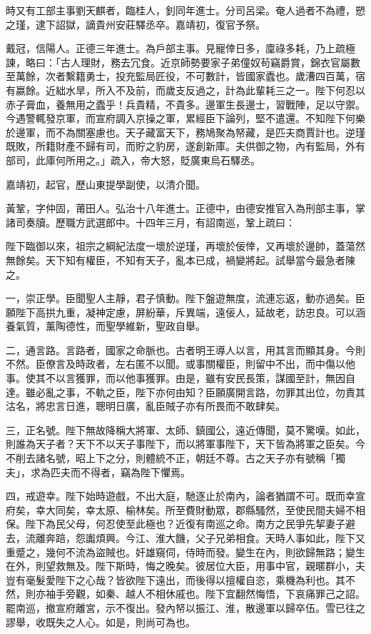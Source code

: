 \begin{pinyinscope}
時又有工部主事劉天麒者，臨桂人，釗同年進士。分司呂梁。奄人過者不為禮，愬之瑾，逮下詔獄，謫貴州安莊驛丞卒。嘉靖初，復官予祭。

戴冠，信陽人。正德三年進士。為戶部主事。見寵倖日多，廩祿多耗，乃上疏極諫，略曰：「古人理財，務去冗食。近京師勢要家子弟僮奴茍竊爵賞，錦衣官屬數至萬餘，次者繫籍勇士，投充監局匠役，不可數計，皆國家蠹也。歲漕四百萬，宿有嬴餘。近絀水旱，所入不及前，而歲支反過之，計為此輩耗三之一。陛下何忍以赤子膏血，養無用之蠹乎！兵貴精，不貴多。邊軍生長邊士，習戰陣，足以守禦。今遇警輒發京軍，而宣府調入京操之軍，累經臣下論列，堅不遣還。不知陛下何樂於邊軍，而不為關塞慮也。天子藏富天下，務鳩聚為帑藏，是匹夫商賈計也。逆瑾既敗，所籍財產不歸有司，而貯之豹房，遂創新庫。夫供御之物，內有監局，外有部司，此庫何所用之。」疏入，帝大怒，貶廣東烏石驛丞。

嘉靖初，起官，歷山東提學副使，以清介聞。

黃鞏，字仲固，莆田人。弘治十八年進士。正德中，由德安推官入為刑部主事，掌諸司奏牘。歷職方武選郎中。十四年三月，有詔南巡，鞏上疏曰：

陛下臨御以來，祖宗之綱紀法度一壞於逆瑾，再壞於佞倖，又再壞於邊帥，蓋蕩然無餘矣。天下知有權臣，不知有天子，亂本已成，禍變將起。試舉當今最急者陳之。

一，崇正學。臣聞聖人主靜，君子慎動。陛下盤遊無度，流連忘返，動亦過矣。臣願陛下高拱九重，凝神定慮，屏紛華，斥異端，遠佞人，延故老，訪忠良。可以涵養氣質，薰陶德性，而聖學維新，聖政自舉。

二，通言路。言路者，國家之命脈也。古者明王導人以言，用其言而顯其身。今則不然。臣僚言及時政者，左右匿不以聞。或事關權臣，則留中不出，而中傷以他事。使其不以言獲罪，而以他事獲罪。由是，雖有安民長策，謀國至計，無因自達。雖必亂之事，不軌之臣，陛下亦何由知？臣願廣開言路，勿罪其出位，勿責其沽名，將忠言日進，聰明日廣，亂臣賊子亦有所畏而不敢肆矣。

三，正名號。陛下無故降稱大將軍、太師、鎮國公，遠近傳聞，莫不驚嘆。如此，則誰為天子者？天下不以天子事陛下，而以將軍事陛下，天下皆為將軍之臣矣。今不削去諸名號，昭上下之分，則體統不正，朝廷不尊。古之天子亦有號稱「獨夫」，求為匹夫而不得者，竊為陛下懼焉。

四，戒遊幸。陛下始時遊戲，不出大庭，馳逐止於南內，論者猶謂不可。既而幸宣府矣，幸大同矣，幸太原、榆林矣。所至費財動眾，郡縣騷然，至使民間夫婦不相保。陛下為民父母，何忍使至此極也？近復有南巡之命。南方之民爭先挈妻子避去，流離奔踣，怨讟煩興。今江、淮大饑，父子兄弟相食。天時人事如此，陛下又重蹙之，幾何不流為盜賊也。奸雄窺伺，侍時而發。變生在內，則欲歸無路；變生在外，則望救無及。陛下斯時，悔之晚矣。彼居位大臣，用事中官，親暱群小，夫豈有毫髮愛陛下之心哉？皆欲陛下遠出，而後得以擅權自恣，乘機為利也。其不然，則亦袖手旁觀，如秦、越人不相休戚也。陛下宜翻然悔悟，下哀痛罪己之詔。罷南巡，撤宣府離宮，示不復出。發內帑以振江、淮，散邊軍以歸卒伍。雪已往之謬舉，收既失之人心。如是，則尚可為也。


\end{pinyinscope}
